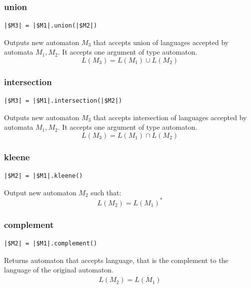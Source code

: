\documentclass{ctuthesis}
\begin{document}
\subsubsection{union}
\begin{lstlisting}[language = JASL_snippet]
	|$M3| = |$M1|.union(|$M2|)
\end{lstlisting}

Outputs new automaton $M_3$ that accepts union of languages accepted by automata $M_1, M_2$. It accepts one argument of type automaton.
\begin{equation*}
L(M_3) = L(M_1) \cup L(M_2)
\end{equation*}

\subsubsection{intersection}
\begin{lstlisting}[language = JASL_snippet]
	|$M3| = |$M1|.intersection(|$M2|)
\end{lstlisting}

Outputs new automaton $M_3$ that accepts intersection of languages accepted by automata $M_1, M_2$. It accepts one argument of type automaton.
\begin{equation*}
	L(M_3) = L(M_1) \cap L(M_2)
\end{equation*}

\subsubsection{kleene}
\begin{lstlisting}[language = JASL_snippet]
	|$M2| = |$M1|.kleene()
\end{lstlisting}

Output new automaton $M_2$ such that:
\begin{equation*}
	L(M_2) = L(M_1)^*
\end{equation*}

\subsubsection{complement}
\begin{lstlisting}[language = JASL_snippet]
	|$M2| = |$M1|.complement()
\end{lstlisting}

Returns automaton that accepts language, that is the complement to the language of the original automaton.
\begin{equation*}
	L(M_2) = \overline{L(M_1)}
\end{equation*}
\end{document}
